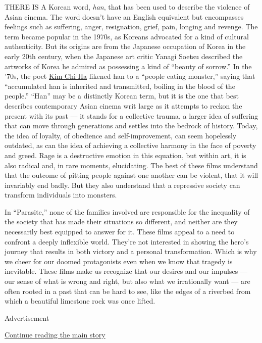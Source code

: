 THERE IS A Korean word, \emph{han}, that has been used to describe the
violence of Asian cinema. The word doesn't have an English equivalent
but encompasses feelings such as suffering, anger, resignation, grief,
pain, longing and revenge. The term became popular in the 1970s, as
Koreans advocated for a kind of cultural authenticity. But its origins
are from the Japanese occupation of Korea in the early 20th century,
when the Japanese art critic Yanagi Soetsu described the artworks of
Korea he admired as possessing a kind of ``beauty of sorrow.'' In the
'70s, the poet
\href{https://www.nytimes3xbfgragh.onion/1987/07/31/world/voice-of-dissent-in-south-korea-speaks-in-verse.html}{Kim
Chi Ha} likened han to a ``people eating monster,'' saying that
``accumulated han is inherited and transmitted, boiling in the blood of
the people.'' ``Han'' may be a distinctly Korean term, but it is the one
that best describes contemporary Asian cinema writ large as it attempts
to reckon the present with its past --- it stands for a collective
trauma, a larger idea of suffering that can move through generations and
settles into the bedrock of history. Today, the idea of loyalty, of
obedience and self-improvement, can seem hopelessly outdated, as can the
idea of achieving a collective harmony in the face of poverty and greed.
Rage is a destructive emotion in this equation, but within art, it is
also radical and, in rare moments, elucidating. The best of these films
understand that the outcome of pitting people against one another can be
violent, that it will invariably end badly. But they also understand
that a repressive society can transform individuals into monsters.

In ``Parasite,'' none of the families involved are responsible for the
inequality of the society that has made their situations so different,
and neither are they necessarily best equipped to answer for it. These
films appeal to a need to confront a deeply inflexible world. They're
not interested in showing the hero's journey that results in both
victory and a personal transformation. Which is why we cheer for our
doomed protagonists even when we know that tragedy is inevitable. These
films make us recognize that our desires and our impulses --- our sense
of what is wrong and right, but also what we irrationally want --- are
often rooted in a past that can be hard to see, like the edges of a
riverbed from which a beautiful limestone rock was once lifted.

Advertisement

\protect\hyperlink{after-bottom}{Continue reading the main story}

